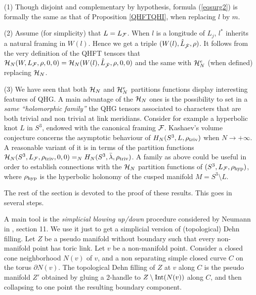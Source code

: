 \begin{remarks}\label{remsurg}{\rm  
\smallskip

(1) Though disjoint and complementary by hypothesis, formula
    (\ref{eqsurg2}) is formally the same as that of Proposition
    \ref{QHFTQHI}, when replacing $l$ by $m$.
\smallskip

(2) Assume (for simplicity) that $L=L_{\mathcal F}$. When $l$ is a longitude of
$L_j$, $l^*$ inherits a natural framing in $W(l)$. Hence we get a
triple $(W(l),\hat L_{\hat {{\mathcal F}}},\rho)$. It follows from the very
definition of the QHFT tensors that ${\mathcal H}_N(W,L_{\mathcal F},\rho,0,0)=
{\mathcal H}_N(W(l),\hat L_{\hat {{\mathcal F}}},\rho,0,0)$ and the same with ${\mathcal H}_N^e$
(when defined) replacing ${\mathcal H}_N$.

\smallskip

(3) We have seen that both ${\mathcal H}_N$ and ${\mathcal H}_N^e$ partitions functions
display interesting features of QHG. A main advantage of the ${\mathcal H}_N$
ones is the possibility to set in a {\it same ``holomorphic family''}
the QHG tensors associated to characters that are both trivial and non
trivial at link meridians.  Consider for example a hyperbolic knot $L$
in $S^3$, endowed with the canonical framing ${\mathcal F}$. Kashaev's volume
conjecture concerns the asymptotic behaviour of $H_N(S^3,L,\rho_{{\rm
    triv}})$ when $N\to +\infty$.  A reasonable variant of it is in
terms of the partition functions ${\mathcal H}_N(S^3,L_{\mathcal F},\rho_{{\rm triv}}
,0,0)=_N H_N(S^3,\bar \lambda,\rho_{{\rm triv}}) $.  A family as above
could be useful in order to establish connections with the ${\mathcal H}_N$
partition functions of $(S^3,L_{\mathcal F},\rho_{{\rm hyp}})$, where
$\rho_{\rm hyp}$ is the hyperbolic holonomy of the cusped manifold $M=
S^3\setminus L$.}
\end{remarks}

The rest of the section is devoted to the proof of these results.
This goes in several steps.

\smallskip

A main tool is the {\it simplicial blowing up/down} procedure
considered by Neumann in \cite{N}, section 11. We use it just
to get a simplicial version of (topological) Dehn filling.  Let $Z$ be
a pseudo manifold without boundary such that every non-manifold point
has toric link. Let $v$ be a non-manifold point. Consider a closed
cone neighborhood $N(v)$ of $v$, and a non separating simple closed
curve $C$ on the torus  $\partial N(v)$. The topological Dehn
filling of $Z$ at $v$ along $C$ is the pseudo manifold $Z'$ obtained by
gluing a $2$-handle to $Z\setminus {\rm Int}(N(v))$ along $C$, and then
collapsing to one point the resulting boundary component. 
\smallskip


